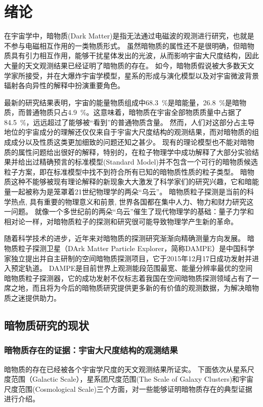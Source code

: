 \chapter{绪论}
\label{ch:introduction}

在宇宙学中，暗物质(Dark Matter)是指无法通过电磁波的观测进行研究，也就是不参与电磁相互作用的一类物质形式。
虽然暗物质的属性还不是很明确，但暗物质具有引力相互作用，能够干扰星体发出的光波，从而影响宇宙大尺度结构，因此大量的天文观测结果已经证明了暗物质的存在。
如今，暗物质假说被大多数天文学家所接受，并在大爆炸宇宙学模型，星系的形成与演化模型以及对宇宙微波背景辐射各向异性的解释中扮演重要角色。

最新的研究结果表明\parencite{planck_collaboration_planck_2014}，宇宙的能量物质组成中\SI{68.3}{\percent}是暗能量，\SI{26.8}{\percent}是暗物质，而普通物质只占\SI{4.9}{\percent}。这意味着，暗物质在宇宙全部物质质量中占据了\SI{84.5}{\percent}，远远超过了能够被“看到”的普通物质含量。
然而，人们对这部分占主导地位的宇宙成分的理解还仅仅来自于宇宙大尺度结构的观测结果，而对暗物质的组成成分以及性质这类更加细致的问题还知之甚少。
现有的理论模型也不能对暗物质的属性问题给出很好的解释，特别的，在粒子物理学中成功解释了大部分实验结果并给出过精确预言的标准模型(Standard Model)并不包含一个可行的暗物质候选粒子方案，即在标准模型中找不到符合所有已知的暗物质性质的粒子类型。
暗物质这种不能够被现有理论解释的新现象大大激发了科学家们的研究兴趣，它和暗能量一起被称为是笼罩着21世纪物理学的两朵“乌云”。
暗物质粒子探测是当前的科学热点, 具有重要的物理意义和前景, 世界各国都在集中人力、物力和财力研究这一问题。
就像一个多世纪前的两朵“乌云”催生了现代物理学的基础：量子力学和相对论一样，对暗物质粒子的探测和研究很可能导致物理学产生新的革命。

随着科学技术的进步，近年来对暗物质的探测研究渐渐向精确测量方向发展。
暗物质粒子探测卫星（DArk Matter Particle Explorer，简称DAMPE）是中国科学家独立提出并自主研制的空间暗物质探测项目，它于2015年12月17日成功发射并进入预定轨道。
DAMPE是目前世界上观测能段范围最宽、能量分辨率最优的空间暗物质粒子探测器，它的成功发射不仅标志着我国在空间暗物质探测领域占有了一席之地，而且将为今后的暗物质研究提供更多新的有价值的观测数据，为解决暗物质之迷提供助力。

\section{暗物质研究的现状}
\subsection{暗物质存在的证据：宇宙大尺度结构的观测结果}
暗物质的存在已经被各个宇宙学尺度的天文观测结果所证实。
下面依次从星系尺度范围（Galactic Scale），星系团尺度范围(The Scale of Galaxy Clusters)和宇宙尺度范围(Cosmological Scale)三个方面，对一些能够证明暗物质存在的典型证据进行介绍。

